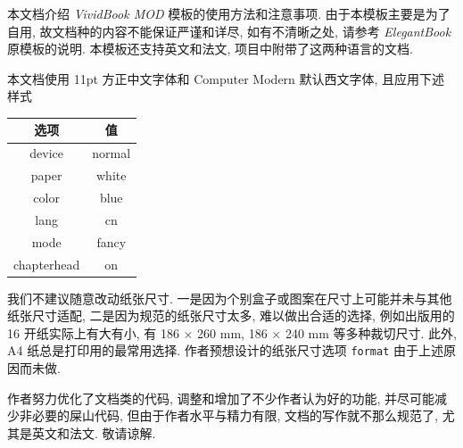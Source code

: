 
本文档介绍 \textit{VividBook MOD} 模板的使用方法和注意事项. 由于本模板主要是为了自用, 故文档种的内容不能保证严谨和详尽, 如有不清晰之处, 请参考 \textit{ElegantBook} 原模板的说明. 本模板还支持英文和法文, 项目中附带了这两种语言的文档.

本文档使用 11pt 方正中文字体和 Computer Modern 默认西文字体, 且应用下述样式 

\begin{table}[htbp]
    \centering
    \begin{tabular}{c|c}
        选项 & 值 \\ \hline
        device & normal \\ 
        paper & white \\ 
        color & blue \\ 
        lang & cn \\ 
        mode & fancy \\ 
        chapterhead & on 
    \end{tabular}
\end{table}

我们不建议随意改动纸张尺寸. 一是因为个别盒子或图案在尺寸上可能并未与其他纸张尺寸适配, 二是因为规范的纸张尺寸太多, 难以做出合适的选择, 例如出版用的 16 开纸实际上有大有小, 有 186 $\times$ 260 mm, 186 \( \times  \) 240 mm 等多种裁切尺寸. 此外, A4 纸总是打印用的最常用选择. 作者预想设计的纸张尺寸选项 \texttt{format} 由于上述原因而未做. 

作者努力优化了文档类的代码, 调整和增加了不少作者认为好的功能, 并尽可能减少非必要的屎山代码, 但由于作者水平与精力有限, 文档的写作就不那么规范了, 尤其是英文和法文. 敬请谅解.

